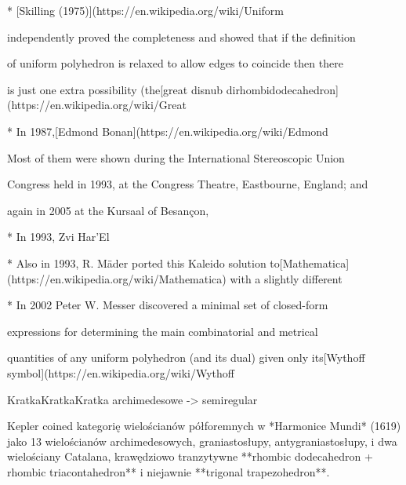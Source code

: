 * [Skilling (1975)](https://en.wikipedia.org/wiki/Uniform%

independently proved the completeness and showed that if the definition

of uniform polyhedron is relaxed to allow edges to coincide then there

is just one extra possibility (the[great disnub dirhombidodecahedron](https://en.wikipedia.org/wiki/Great%

* In 1987,[Edmond Bonan](https://en.wikipedia.org/wiki/Edmond%

Most of them were shown during the International Stereoscopic Union

Congress held in 1993, at the Congress Theatre, Eastbourne, England; and

again in 2005 at the Kursaal of Besançon, %

* In 1993, Zvi Har'El %

* Also in 1993, R. Mäder ported this Kaleido solution to[Mathematica](https://en.wikipedia.org/wiki/Mathematica) with a slightly different %

* In 2002 Peter W. Messer discovered a minimal set of closed-form

expressions for determining the main combinatorial and metrical

quantities of any uniform polyhedron (and its dual) given only its[Wythoff symbol](https://en.wikipedia.org/wiki/Wythoff%

KratkaKratkaKratka archimedesowe -> semiregular

Kepler coined kategorię wielościanów półforemnych w *Harmonice Mundi* (1619) jako 13 wielościanów archimedesowych, graniastosłupy, antygraniastosłupy, i dwa wielościany Catalana, krawędziowo tranzytywne **rhombic dodecahedron + rhombic triacontahedron** i niejawnie **trigonal trapezohedron**.

